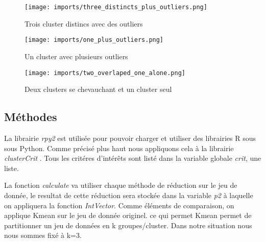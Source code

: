\begin{center}
    \begin{figure}[ht!]
        \centering
        
        \texttt{[image: imports/three\_distincts\_plus\_outliers.png]}
        
        \caption{Trois cluster distincs avec des outliers}
    \end{figure}
\end{center}

\begin{center}
    \begin{figure}[ht!]
        \centering
        
        \texttt{[image: imports/one\_plus\_outliers.png]}
        
        \caption{Un cluster avec plusieurs outliers}
    \end{figure}
\end{center}


\begin{center}
    \begin{figure}[ht!]
        \centering
        
        \texttt{[image: imports/two\_overlaped\_one\_alone.png]}
        
        \caption{Deux clusters se chevauchant et un cluster seul}
    \end{figure}
\end{center}




\subsection{Méthodes}
La librairie \textit{rpy2} est utilisée pour pouvoir charger et utiliser des librairies R sous sous Python. Comme précisé plus haut
nous appliquons cela à la librairie \textit{clusterCrit} . Tous les critéres d'intérêts sont listé dans la variable globale \textit{crit}, une liste.



La fonction \textit{calculate} va utiliser chaque méthode de réduction sur le jeu de donnée, le resultat de cette réduction sera stockée dans
la variable \textit{p2} à laquelle on appliquera la fonction \textit{IntVector}. Comme éléments de comparaison, on applique Kmean sur le jeu de donnée originel. ce qui permet
Kmean permet de partitionner un jeu de données en k groupes/cluster. Dans notre situation nous nous sommes fixé à k=3.

